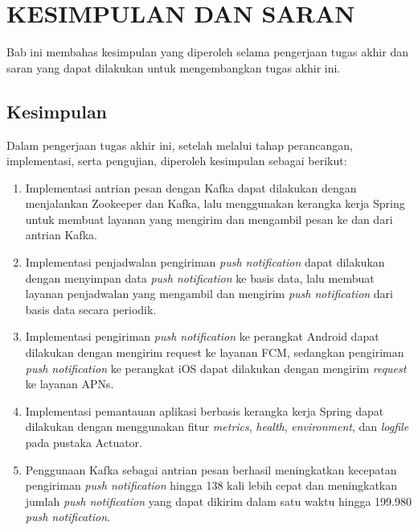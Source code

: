 \chapter{KESIMPULAN DAN SARAN}
\par Bab ini membahas kesimpulan yang diperoleh selama pengerjaan tugas akhir dan saran yang dapat dilakukan untuk mengembangkan tugas akhir ini.

\section{Kesimpulan}
\par Dalam pengerjaan tugas akhir ini, setelah melalui tahap perancangan, implementasi, serta pengujian, diperoleh kesimpulan sebagai berikut:
\begin{enumerate}
	\item Implementasi antrian pesan dengan Kafka dapat dilakukan dengan menjalankan Zookeeper dan Kafka, lalu menggunakan kerangka kerja Spring untuk membuat layanan yang mengirim dan mengambil pesan ke dan dari antrian Kafka.
	\item Implementasi penjadwalan pengiriman \textit{push notification} dapat dilakukan dengan menyimpan data \textit{push notification} ke basis data, lalu membuat layanan penjadwalan yang mengambil dan mengirim \textit{push notification} dari basis data secara periodik.
	\item Implementasi pengiriman \textit{push notification} ke perangkat Android dapat dilakukan dengan mengirim request ke layanan FCM, sedangkan pengiriman \textit{push notification} ke perangkat iOS dapat dilakukan dengan mengirim \textit{request} ke layanan APNs.
	\item Implementasi pemantauan aplikasi berbasis kerangka kerja Spring dapat dilakukan dengan menggunakan fitur \textit{metrics}, \textit{health}, \textit{environment}, dan \textit{logfile} pada pustaka Actuator.
	\item Penggunaan Kafka sebagai antrian pesan berhasil meningkatkan kecepatan pengiriman \textit{push notification} hingga 138 kali lebih cepat dan meningkatkan jumlah \textit{push notification} yang dapat dikirim dalam satu waktu hingga 199.980 \textit{push notification}.
\end{enumerate}

